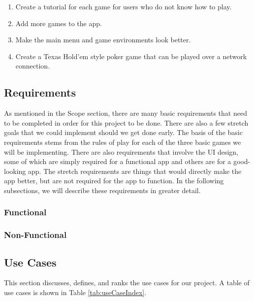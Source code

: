 \documentclass[10pt,conference,onecolumn,compsoc]{IEEEtran}
\begin{document}
\begin{enumerate}
\item Create a tutorial for each game for users who do not know how to play.
\item Add more games to the app.
\item Make the main menu and game environments look better.
\item Create a Texas Hold'em style poker game that can be played over a network connection.
\end{enumerate}

\subsection{Requirements}
As mentioned in the Scope section, there are many basic requirements that need to be completed in order for this project to be done. There are also a few stretch goals that we could implement should we get done early. The basis of the basic requirements stems from the rules of play for each of the three basic games we will be implementing. There are also requirements that involve the UI design, some of which are simply required for a functional app and others are for a good-looking app. The stretch requirements are things that would directly make the app better, but are not required for the app to function. In the following subsections, we will describe these requirements in greater detail.

\subsubsection{Functional}
\begin{itemize}

\end{itemize}

\subsubsection{Non-Functional}
\begin{itemize}

\end{itemize}

\subsection{Use Cases}
This section discusses, defines, and ranks the use cases for our project. A table of use cases is shown in Table \ref{tab:useCaseIndex}.
\end{document}
